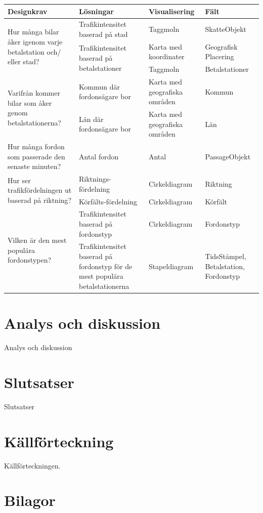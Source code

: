\documentclass{kththesis}
\begin{document}
 \begin{tabular}{|p{3cm}|p{3cm}|p{3cm}|p{3cm}|}
      \hline
     \textbf{Designkrav} & \textbf{Lösningar} & \textbf{Visualisering} & \textbf{Fält}\\
     \hline
  \multirow{3}{3cm}{Hur många bilar åker igenom varje betalstation och/ eller stad?} &  Trafikintensitet baserad på stad & Taggmoln  & SkatteObjekt\\\cline{2-4}
  & \multirow{2}{3cm}{Trafikintensitet baserad på betalstationer} & Karta med koordinater
& Geografisk Placering\\\cline{3-4}  
  & &  Taggmoln
& Betalstationer \\ \hline


  \multirow{2}{3cm}{Varifrån kommer bilar som åker genom betalstationerna?} &  Kommun där fordonsägare bor & Karta med geografiska områden  & Kommun\\\cline{2-4}
  &Län där fordonsägare bor
 & Karta med geografiska områden  & Län\\ \hline
 
Hur många fordon som passerade den senaste minuten? &Antal fordon
 & Antal  & PassageObjekt\\ \hline
 
 \multirow{2}{3cm}{Hur ser trafikfördelningen ut baserad på riktning?} &  Riktnings-fördelning&Cirkeldiagram& Riktning\\\cline{2-4}
  &Körfälts-fördelning 
 & Cirkeldiagram  & Körfält\\ \hline
 
 \multirow{2}{3cm}{Vilken är den mest populära fordonstypen?} &  Trafikintensitet baserad på fordonstyp & Cirkeldiagram& Fordonstyp\\\cline{2-4}
  &Trafikintensitet baserad på fordonstyp för de mest populära betalstationerna 
 & Stapeldiagram  & TidsStämpel, Betalstation, Fordonstyp\\ \hline


\end{tabular}


\chapter{Analys och diskussion}
Analys och diskussion
\blindtext


\chapter{Slutsatser}
Slutsatser
\blindtext

\chapter{Källförteckning}
Källförteckningen.


\chapter{Bilagor}



\end{document}
